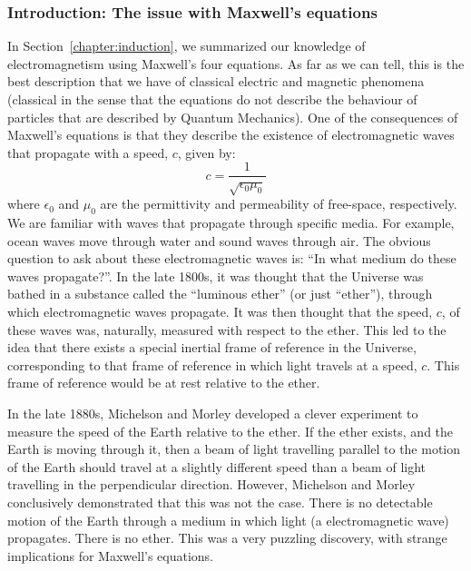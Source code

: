 \subsubsection{Introduction: The issue with Maxwell's equations}


In Section~\ref{chapter:induction}, we summarized our knowledge of electromagnetism using Maxwell's four equations. As far as we can tell, this is the best description that we have of classical electric and magnetic phenomena (classical in the sense that the equations do not describe the behaviour of particles that are described by Quantum Mechanics). One of the consequences of Maxwell's equations is that they describe the existence of electromagnetic waves that propagate with a speed, $c$, given by:
\begin{equation}
c = \frac{1}{\sqrt{\epsilon_0\mu_0}}
\end{equation}
where $\epsilon_0$ and $\mu_0$ are the permittivity and permeability of free-space, respectively. We are familiar with waves that propagate through specific media. For example, ocean waves move through water and sound waves through air. The obvious question to ask about these electromagnetic waves is: ``In what medium do these waves propagate?''. In the late 1800s, it was thought that the Universe was bathed in a substance called the ``luminous ether'' (or just ``ether''), through which electromagnetic waves propagate. It was then thought that the speed, $c$, of these waves was, naturally, measured with respect to the ether. This led to the idea that there exists a special inertial frame of reference in the Universe, corresponding to that frame of reference in which light travels at a speed, $c$. This frame of reference would be at rest relative to the ether.

In the late 1880s, Michelson and Morley developed a clever experiment to measure the speed of the Earth relative to the ether. If the ether exists, and the Earth is moving through it, then a beam of light travelling parallel to the motion of the Earth should travel at a slightly different speed than a beam of light travelling in the perpendicular direction. However, Michelson and Morley conclusively demonstrated that this was not the case. There is no detectable motion of the Earth through a medium in which light (a electromagnetic wave) propagates. There is no ether. This was a very puzzling discovery, with strange implications for Maxwell's equations.


